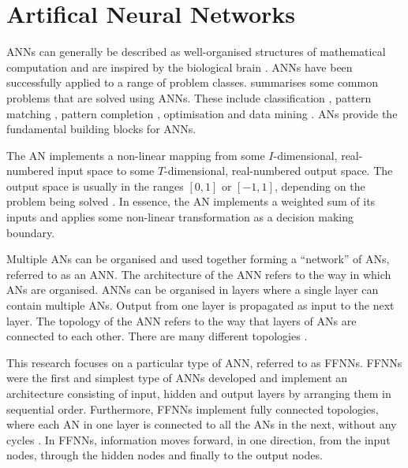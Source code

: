\section{Artifical Neural Networks}
\label{sec:anns}

\acp{ANN} can generally be described as well-organised structures of mathematical computation and are inspired by the biological brain \cite{ref:engelbrecht:2007}. \acp{ANN} have been successfully applied to a range of problem classes. \citeauthor{ref:engelbrecht:2007} \cite{ref:engelbrecht:2007} summarises some common problems that are solved using \acp{ANN}. These include classification \cite{ref:khan:2001}, pattern matching \cite{ref:cannady:1998, ref:kumar:1994}, pattern completion \cite{ref:dayhoff:2001}, optimisation \cite{ref:specht:1991} and data mining \cite{ref:singh:2009}. \acfp{AN} provide the fundamental building blocks for \acp{ANN}.

The \acs{AN} implements a non-linear mapping from some $I$-dimensional, real-numbered input space to some $T$-dimensional, real-numbered output space. The output space is usually in the ranges $[0,1]$ or $[-1,1]$, depending on the problem being solved \cite{ref:engelbrecht:2007}. In essence, the \acs{AN} implements a weighted sum of its inputs and applies some non-linear transformation as a decision making boundary.

Multiple \acp{AN} can be organised and used together forming a ``network'' of \acp{AN}, referred to as an \acs{ANN}. The architecture of the \acs{ANN} refers to the way in which \acp{AN} are organised. \acp{ANN} can be organised in layers where a single layer can contain multiple \acp{AN}. Output from one layer is propagated as input to the next layer. The topology of the \acs{ANN} refers to the way that layers of \acp{AN} are connected to each other. There are many different topologies \cite{ref:miikkulainen:2010}.

This research focuses on a particular type of \acs{ANN}, referred to as \acfp{FFNN}. \acp{FFNN} were the first and simplest type of \acp{ANN} developed \cite{ref:schmidhuber:2015} and implement an architecture consisting of input, hidden and output layers by arranging them in sequential order. Furthermore, \acp{FFNN} implement fully connected topologies, where each \acs{AN} in one layer is connected to all the \acp{AN} in the next, without any cycles \cite{ref:zell:1994}. In \acp{FFNN}, information moves forward, in one direction, from the input nodes, through the hidden nodes and finally to the output nodes.

